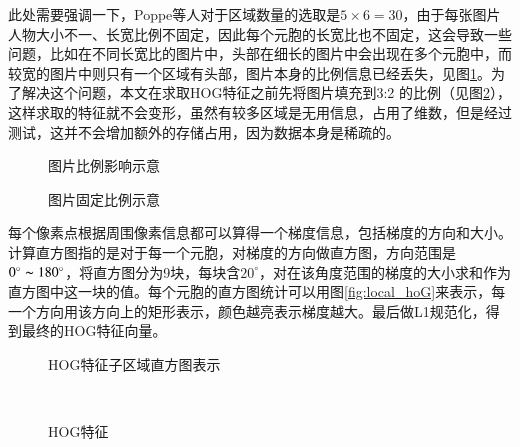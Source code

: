 此处需要强调一下，Poppe等人对于区域数量的选取是$5\times 6=30$，由于每张图片人物大小不一、长宽比例不固定，因此每个元胞的长宽比也不固定，这会导致一些问题，比如在不同长宽比的图片中，头部在细长的图片中会出现在多个元胞中，而较宽的图片中则只有一个区域有头部，图片本身的比例信息已经丢失，见图\ref{fig:broadthin}。为了解决这个问题，本文在求取HOG特征之前先将图片填充到3:2 的比例（见图\ref{fig:broadthin2}），这样求取的特征就不会变形，虽然有较多区域是无用信息，占用了维数，但是经过测试，这并不会增加额外的存储占用，因为数据本身是稀疏的。
\begin{figure}[htbp]
  \centering
  \hspace{.5cm}
  \caption{图片比例影响示意}\label{fig:broadthin}
\end{figure}

\begin{figure}[htbp]
  \centering
  \hspace{.5cm}
  \caption{图片固定比例示意}\label{fig:broadthin2}
\end{figure}

每个像素点根据周围像素信息都可以算得一个梯度信息，包括梯度的方向和大小。计算直方图指的是对于每一个元胞，对梯度的方向做直方图，方向范围是$0^\circ\thicksim180^\circ$，将直方图分为9块，每块含$20^\circ$，对在该角度范围的梯度的大小求和作为直方图中这一块的值。每个元胞的直方图统计可以用图\ref{fig:local_hoG}来表示，每一个方向用该方向上的矩形表示，颜色越亮表示梯度越大。最后做L1规范化，得到最终的HOG特征向量。

\begin{figure}[htbp]
  \centering
  \hspace{.5cm}
  \hspace{.5cm}
  \caption{HOG特征子区域直方图表示}
\end{figure}

\begin{figure}[htbp]
  \centering
  \hspace{.5cm}
  \hspace{.5cm}
  \\
  \hspace{.5cm}
  \hspace{.5cm}
  \caption{HOG特征}
\end{figure}

